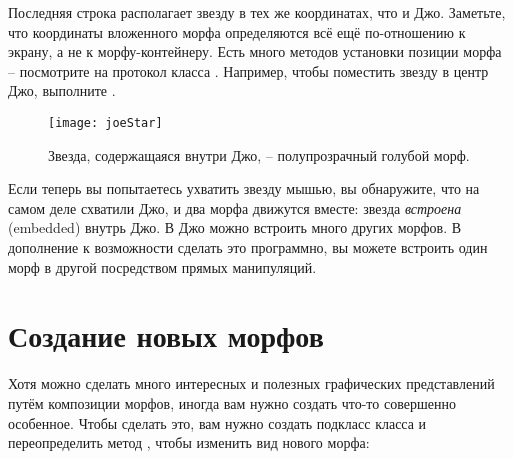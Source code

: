 \documentclass[a4paper,10pt,twoside]{book}
\begin{document}
\noindent
Последняя строка располагает звезду в тех же координатах, что и Джо.
Заметьте, что координаты вложенного морфа определяются всё ещё по-отношению к экрану, а не к морфу-контейнеру.
Есть много методов установки позиции морфа -- посмотрите на протокол  класса .
Например,
чтобы поместить звезду в центр Джо, выполните   .

\begin{figure}[ht]
	\centerline{\texttt{[image: joeStar]}}
	\caption{Звезда, содержащаяся внутри Джо, -- полупрозрачный голубой морф. 
		}
\end{figure}

Если теперь вы попытаетесь ухватить звезду мышью, вы обнаружите, что на самом деле схватили Джо, и два морфа движутся вместе: звезда \emph{встроена} (embedded) внутрь Джо.
В Джо можно встроить много других морфов.
В дополнение к возможности сделать это программно, вы можете встроить один морф в другой посредством прямых манипуляций.

\section{Создание новых морфов}

Хотя можно сделать много интересных и полезных графических представлений путём композиции морфов, иногда вам нужно создать что-то совершенно особенное.
Чтобы сделать это, вам нужно создать подкласс класса  и переопределить метод , чтобы изменить вид нового морфа:
\end{document}
